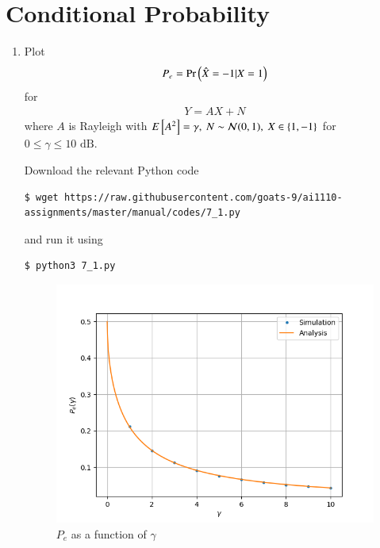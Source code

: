 \documentclass[journal,12pt,twocolumn]{IEEEtran}
\renewcommand\thesection{\arabic{section}}
\begin{document}
\section{Conditional Probability}
\begin{enumerate}[label=\thesection.\arabic*
,ref=\thesection.\theenumi]
\item Plot 
	\begin{align}
		P_e = \Pr\left(\hat{X} = -1|X = 1\right)
	\end{align}
for 
	\begin{align}
		Y = AX + N
	\end{align}
where $A$ is Rayleigh with $E{}\left[A^2\right] = \gamma,\ N \sim \mathcal{N}(0, 1),\ X \in \left\{1, -1\right\}$ for $0 \leq \gamma \leq 10 \text{ dB}$.

\solution
Download the relevant Python code
\begin{lstlisting}
$ wget https://raw.githubusercontent.com/goats-9/ai1110-assignments/master/manual/codes/7_1.py
\end{lstlisting}
and run it using
\begin{lstlisting}
$ python3 7_1.py
\end{lstlisting}
\begin{figure}[!htb]
	\includegraphics[width=\columnwidth]{figs/7_1.png}
	\caption{$P_e$ as a function of $\gamma$}
	\label{fig:err-gamma}
\end{figure}
\begin{figure}[!htb]

\end{figure}
\end{enumerate}
\end{document}
